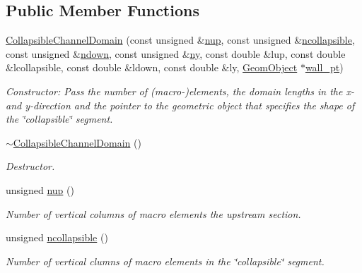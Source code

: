 \subsection*{Public Member Functions}
\begin{DoxyCompactItemize}
\item 
\hyperlink{classoomph_1_1CollapsibleChannelDomain_a85e64b812b36155302407269d77dc6b3}{Collapsible\+Channel\+Domain} (const unsigned \&\hyperlink{classoomph_1_1CollapsibleChannelDomain_a7e098bcffc76332af4ca220701fd32e2}{nup}, const unsigned \&\hyperlink{classoomph_1_1CollapsibleChannelDomain_a59dd9d4001621752439ad95ceb8daa1b}{ncollapsible}, const unsigned \&\hyperlink{classoomph_1_1CollapsibleChannelDomain_a0e1c69ac122606e4f883e96b51989d9f}{ndown}, const unsigned \&\hyperlink{classoomph_1_1CollapsibleChannelDomain_a62e15782984f3d5e10ba44a6d8ad06ee}{ny}, const double \&lup, const double \&lcollapsible, const double \&ldown, const double \&ly, \hyperlink{classoomph_1_1GeomObject}{Geom\+Object} $\ast$\hyperlink{classoomph_1_1CollapsibleChannelDomain_a0a98c02b478d61d2cd4c899d0d37344a}{wall\+\_\+pt})
\begin{DoxyCompactList}\small\item\em Constructor\+: Pass the number of (macro-\/)elements, the domain lengths in the x-\/ and y-\/direction and the pointer to the geometric object that specifies the shape of the \char`\"{}collapsible\char`\"{} segment. \end{DoxyCompactList}\item 
\hyperlink{classoomph_1_1CollapsibleChannelDomain_a22469fc91a872e6252133af6e97d6e48}{$\sim$\+Collapsible\+Channel\+Domain} ()
\begin{DoxyCompactList}\small\item\em Destructor. \end{DoxyCompactList}\item 
unsigned \hyperlink{classoomph_1_1CollapsibleChannelDomain_a7e098bcffc76332af4ca220701fd32e2}{nup} ()
\begin{DoxyCompactList}\small\item\em Number of vertical columns of macro elements the upstream section. \end{DoxyCompactList}\item 
unsigned \hyperlink{classoomph_1_1CollapsibleChannelDomain_a59dd9d4001621752439ad95ceb8daa1b}{ncollapsible} ()
\begin{DoxyCompactList}\small\item\em Number of vertical clumns of macro elements in the \char`\"{}collapsible\char`\"{} segment. \end{DoxyCompactList}\item 

\end{DoxyCompactItemize}
